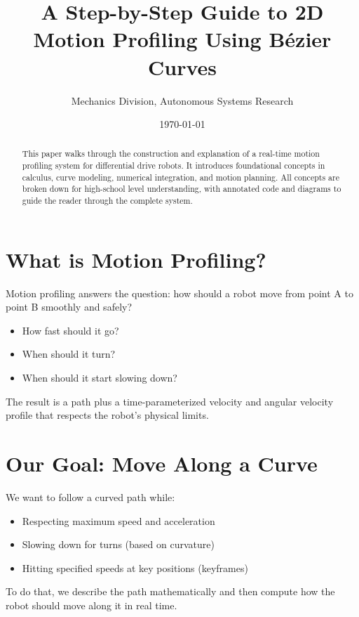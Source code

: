 \documentclass[11pt]{article}
\title{A Step-by-Step Guide to 2D Motion Profiling Using Bézier Curves}
\author{Mechanics Division, Autonomous Systems Research}
\date{\today}
\begin{document}
\maketitle

\begin{abstract}
This paper walks through the construction and explanation of a real-time motion profiling system for differential drive robots. It introduces foundational concepts in calculus, curve modeling, numerical integration, and motion planning. All concepts are broken down for high-school level understanding, with annotated code and diagrams to guide the reader through the complete system.
\end{abstract}

\tableofcontents
\newpage

\section{What is Motion Profiling?}

Motion profiling answers the question: how should a robot move from point A to point B smoothly and safely?

\begin{itemize}
  \item How fast should it go?
  \item When should it turn?
  \item When should it start slowing down?
\end{itemize}

The result is a path plus a time-parameterized velocity and angular velocity profile that respects the robot’s physical limits.

\section{Our Goal: Move Along a Curve}

We want to follow a curved path while:
\begin{itemize}
  \item Respecting maximum speed and acceleration
  \item Slowing down for turns (based on curvature)
  \item Hitting specified speeds at key positions (keyframes)
\end{itemize}

To do that, we describe the path mathematically and then compute how the robot should move along it in real time.
\end{document}
